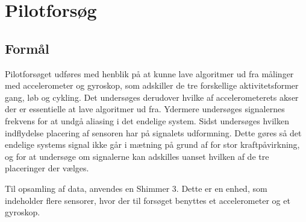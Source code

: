 \chapter{Pilotforsøg}\vspace{-.75cm}
\section{Formål}
Pilotforsøget udføres med henblik på at kunne lave algoritmer ud fra målinger med accelerometer og gyroskop, som adskiller de tre forskellige aktivitetsformer gang, løb og cykling. Det undersøges derudover hvilke af accelerometerets akser der er essentielle at lave algoritmer ud fra. Ydermere undersøges signalernes frekvens for at undgå aliasing i det endelige system. Sidst undersøges hvilken indflydelse placering af sensoren har på signalets udformning. Dette gøres så det endelige systems signal ikke går i mætning på grund af for stor kraftpåvirkning, og for at undersøge om signalerne kan adskilles uanset hvilken af de tre placeringer der vælges.

Til opsamling af data, anvendes en Shimmer 3. Dette er en enhed, som indeholder flere sensorer, hvor der til forsøget benyttes et accelerometer og et gyroskop. 



